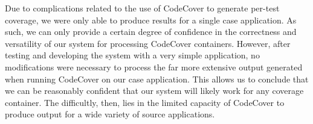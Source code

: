 Due to complications related to the use of CodeCover to generate per-test coverage, we were only able
to produce results for a single case application.  As such, we can only provide a certain degree of
confidence in the correctness and versatility of our system for processing CodeCover containers.  However,
after testing and developing the system with a very simple application, no modifications were necessary
to process the far more extensive output generated when running CodeCover on our case application.  This 
allows us to conclude that we can be reasonably confident that our system will likely work for any
coverage container.  The difficultly, then, lies in the limited capacity of CodeCover to produce 
output for a wide variety of source applications.

